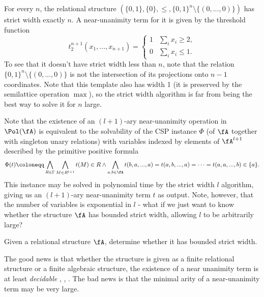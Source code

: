 
\begin{ex}\label{ex-strict-width-n} For every $n$, the relational structure $(\{0,1\}, \{0\}, \le, \{0,1\}^n\setminus\{(0,...,0)\})$ has strict width exactly $n$. A near-unanimity term for it is given by the threshold function
\[
t_2^{n+1}(x_1, ..., x_{n+1}) = \begin{cases} 1 & \sum_i x_i \ge 2,\\ 0 & \sum_i x_i \le 1.\end{cases}
\]
To see that it doesn't have strict width less than $n$, note that the relation $\{0,1\}^n\setminus\{(0,...,0)\}$ is not the intersection of its projections onto $n-1$ coordinates. Note that this template also has width 1 (it is preserved by the semilattice operation $\max$), so the strict width algorithm is far from being the best way to solve it for $n$ large.
\end{ex}

Note that the existence of an $(l+1)$-ary near-unanimity operation in $\Pol(\fA)$ is equivalent to the solvability of the CSP instance $\Phi$ (of $\fA$ together with singleton unary relations) with variables indexed by elements of $\fA^{l+1}$ described by the primitive positive formula
\[
\Phi(t) \coloneqq \bigwedge_{R \in \Gamma} \bigwedge_{M \in R^{l+1}} t(M) \in R \wedge \bigwedge_{a,b \in \fA} t(b,a, ..., a) = t(a,b,...,a) = \cdots = t(a,a,...,b) \in \{a\}.
\]
This instance may be solved in polynomial time by the strict width $l$ algorithm, giving us an $(l+1)$-ary near-unanimity term $t$ as output. Note, however, that the number of variables is exponential in $l$ - what if we just want to know whether the structure $\fA$ has bounded strict width, allowing $l$ to be arbitrarily large?

\begin{prob} Given a relational structure $\fA$, determine whether it has bounded strict width.
\end{prob}

The good news is that whether the structure is given as a finite relational structure or a finite algebraic structure, the existence of a near unanimity term is at least \emph{decidable} \cite{near-unanimity-maroti}, \cite{near-unanimity-congruence-distributive}, \cite{near-unanimity-zhuk}. The bad news is that the minimal arity of a near-unanimity term may be very large.


